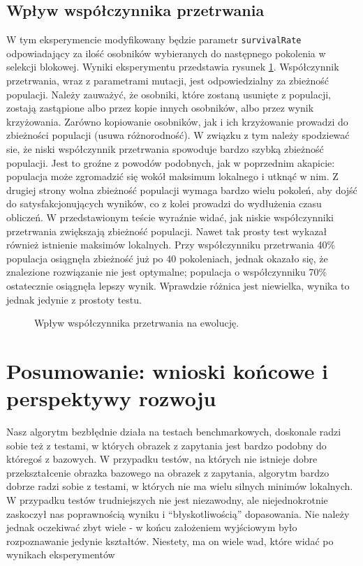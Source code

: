 \documentclass[a4paper,12pt,leqno]{article}
\begin{document}
\subsection{Wpływ współczynnika przetrwania}
W tym eksperymencie modyfikowany będzie parametr \texttt{survivalRate} odpowiadający za ilość osobników wybieranych do następnego pokolenia w
selekcji blokowej. Wyniki eksperymentu przedstawia rysunek \ref{surv}. Współczynnik przetrwania, wraz z parametrami mutacji, jest odpowiedzialny
za zbieżność populacji. Należy zauważyć, że osobniki, które zostaną usunięte z populacji, zostają zastąpione albo przez kopie innych osobników,
albo przez wynik krzyżowania. Zarówno kopiowanie osobników, jak i ich krzyżowanie prowadzi do zbieżności populacji (usuwa różnorodność). W związku
z tym należy spodziewać sie, że niski współczynnik przetrwania spowoduje bardzo szybką zbieżność populacji. Jest to groźne z powodów podobnych,
jak w poprzednim akapicie: populacja może zgromadzić się wokół maksimum lokalnego i utknąć w nim. Z drugiej strony wolna zbieżność populacji
wymaga bardzo wielu pokoleń, aby dojść do satysfakcjonujących wyników, co z kolei prowadzi do wydłużenia czasu obliczeń. W przedstawionym teście
wyraźnie widać, jak niskie współczynniki przetrwania zwiększają zbieżność populacji. Nawet tak prosty test wykazał również istnienie maksimów
lokalnych. Przy współczynniku przetrwania 40\% populacja osiągnęła zbieżność już po 40 pokoleniach, jednak okazało się, że znalezione rozwiązanie
nie jest optymalne; populacja o współczynniku 70\% ostatecznie osiągnęła lepszy wynik. Wprawdzie różnica jest niewielka, wynika to jednak jedynie
z prostoty testu.

\begin{figure}\centering
\footnotesize\vspace{-2em}
\normalsize\caption{Wpływ współczynnika przetrwania na ewolucję.}\label{surv}
\end{figure}

\section{Posumowanie: wnioski końcowe i perspektywy rozwoju}
Nasz algorytm bezbłędnie działa na testach benchmarkowych, doskonale radzi sobie też z testami, w których obrazek z zapytania jest bardzo podobny do któregoś z bazowych.
W przypadku testów, na których nie istnieje dobre przekształcenie obrazka bazowego na obrazek z zapytania, algorytm bardzo dobrze radzi sobie z testami, 
w których nie ma wielu silnych minimów lokalnych. W przypadku testów trudniejszych nie jest niezawodny, ale niejednokrotnie zaskoczył nas poprawnością wyniku i ``błyskotliwością'' dopasowania.
Nie należy jednak oczekiwać zbyt wiele - w końcu założeniem wyjściowym było rozpoznawanie jedynie kształtów.
Niestety, ma on wiele wad, które widać po wynikach eksperymentów
\end{document}
